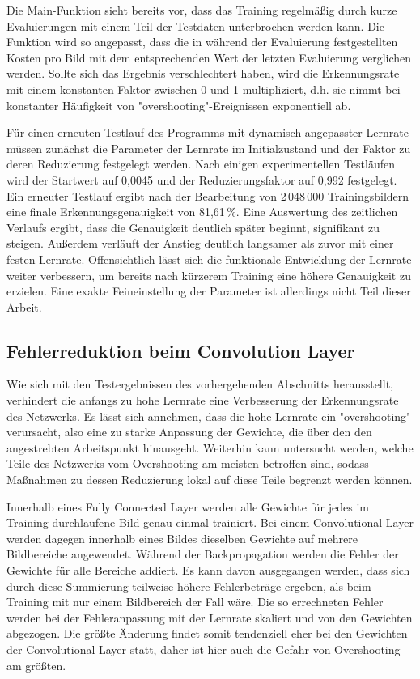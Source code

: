\documentclass[../main.tex]{subfiles}
\begin{document}
Die Main-Funktion sieht bereits vor, dass das Training regelmäßig durch kurze Evaluierungen mit einem Teil der Testdaten unterbrochen werden kann. Die Funktion wird so angepasst, dass die in während der Evaluierung festgestellten Kosten pro Bild mit dem entsprechenden Wert der letzten Evaluierung verglichen werden. Sollte sich das Ergebnis verschlechtert haben, wird die Erkennungsrate mit einem konstanten Faktor zwischen 0 und 1 multipliziert, d.h. sie nimmt bei konstanter Häufigkeit von "overshooting"-Ereignissen exponentiell ab. 

Für einen erneuten Testlauf des Programms mit dynamisch angepasster Lernrate müssen zunächst die Parameter der Lernrate im Initialzustand und der Faktor zu deren Reduzierung festgelegt werden. Nach einigen experimentellen Testläufen wird der Startwert auf 0,0045 und der Reduzierungsfaktor auf 0,992 festgelegt. Ein erneuter Testlauf  ergibt nach der Bearbeitung von 2\,048\,000 Trainingsbildern eine finale Erkennungsgenauigkeit von 81,61\,\%. Eine Auswertung des zeitlichen Verlaufs ergibt, dass die Genauigkeit deutlich später beginnt, signifikant zu steigen. Außerdem verläuft der Anstieg deutlich langsamer als zuvor mit einer festen Lernrate. Offensichtlich lässt sich die funktionale Entwicklung der Lernrate weiter verbessern, um bereits nach kürzerem Training eine höhere Genauigkeit zu erzielen. Eine exakte Feineinstellung der Parameter ist allerdings nicht Teil dieser Arbeit. 

\subsection{Fehlerreduktion beim Convolution Layer}
Wie sich  mit den Testergebnissen des vorhergehenden Abschnitts herausstellt, verhindert die anfangs zu hohe Lernrate eine Verbesserung der Erkennungsrate des Netzwerks. Es lässt sich annehmen, dass die hohe Lernrate ein "overshooting" verursacht, also eine zu starke Anpassung der Gewichte, die über den den angestrebten Arbeitspunkt hinausgeht. Weiterhin kann untersucht werden, welche Teile des Netzwerks vom Overshooting am meisten betroffen sind, sodass Maßnahmen zu dessen Reduzierung lokal auf diese Teile begrenzt werden können. 

Innerhalb eines Fully Connected Layer werden alle Gewichte für jedes im Training durchlaufene Bild genau einmal trainiert. Bei einem Convolutional Layer werden dagegen innerhalb eines Bildes dieselben Gewichte auf mehrere Bildbereiche angewendet. Während der Backpropagation werden die Fehler der Gewichte für alle Bereiche addiert. Es kann davon ausgegangen werden, dass sich durch diese Summierung teilweise höhere Fehlerbeträge ergeben, als beim Training mit nur einem Bildbereich der Fall wäre. Die so errechneten Fehler werden bei der Fehleranpassung mit der Lernrate skaliert und von den Gewichten abgezogen. Die größte Änderung findet somit tendenziell eher bei den Gewichten der Convolutional Layer statt, daher ist hier auch die Gefahr von Overshooting am größten. 
\end{document}
